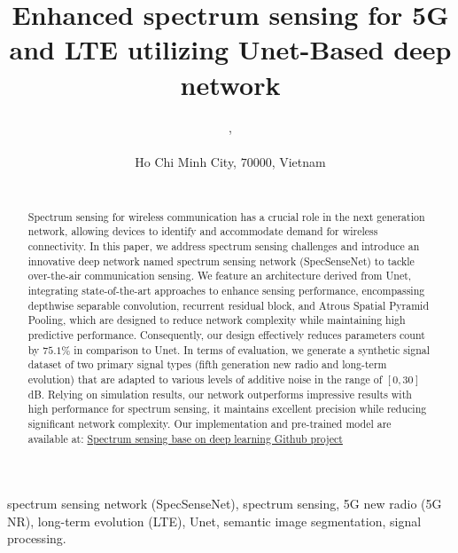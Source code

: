 \documentclass[journal]{IEEEtran} %
\begin{document}
\title{Enhanced spectrum sensing for 5G and LTE utilizing Unet-Based deep network}
\author{%
    , %
    \\%
    \\
    {Ho Chi Minh City, $70000$, Vietnam}\\%
     \\
}
\maketitle

\begin{abstract}
Spectrum sensing for wireless communication has a crucial role in the next generation network, allowing devices to identify and accommodate demand for wireless connectivity. In this paper, we address spectrum sensing challenges and introduce an innovative deep network named spectrum sensing network (SpecSenseNet) to tackle over-the-air communication sensing. We feature an architecture derived from Unet, integrating state-of-the-art approaches to enhance sensing performance, encompassing depthwise separable convolution, recurrent residual block, and Atrous Spatial Pyramid Pooling, which are designed to reduce network complexity while maintaining high predictive performance. Consequently, our design effectively reduces parameters count by $75.1\%$ in comparison to Unet. In terms of evaluation, we generate a synthetic signal dataset of two primary signal types (fifth generation new radio and long-term evolution) that are adapted to various levels of additive noise in the range of $[0, 30]$ dB. Relying on simulation results, our network outperforms impressive results with high performance for spectrum sensing, it maintains excellent precision while reducing significant network complexity. Our implementation and pre-trained model are available at:
\href{https://github.com/Winxkin/Spectrum_sensing_base_on_Deep_learning.git}{Spectrum sensing base on deep learning Github project}
\end{abstract}

\begin{IEEEkeywords}
    spectrum sensing network (SpecSenseNet), spectrum sensing, 5G new radio (5G NR), long-term evolution (LTE), Unet, semantic image segmentation, signal processing.
\end{IEEEkeywords}
\end{document}
